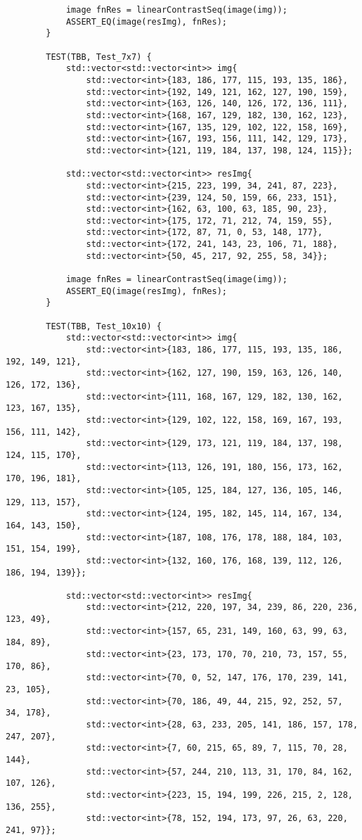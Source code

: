 \documentclass[14pt, russian]{extarticle}
\begin{document}
\begin{lstlisting}
			image fnRes = linearContrastSeq(image(img));
			ASSERT_EQ(image(resImg), fnRes);
		}
		
		TEST(TBB, Test_7x7) {
			std::vector<std::vector<int>> img{
				std::vector<int>{183, 186, 177, 115, 193, 135, 186},
				std::vector<int>{192, 149, 121, 162, 127, 190, 159},
				std::vector<int>{163, 126, 140, 126, 172, 136, 111},
				std::vector<int>{168, 167, 129, 182, 130, 162, 123},
				std::vector<int>{167, 135, 129, 102, 122, 158, 169},
				std::vector<int>{167, 193, 156, 111, 142, 129, 173},
				std::vector<int>{121, 119, 184, 137, 198, 124, 115}};
			
			std::vector<std::vector<int>> resImg{
				std::vector<int>{215, 223, 199, 34, 241, 87, 223},
				std::vector<int>{239, 124, 50, 159, 66, 233, 151},
				std::vector<int>{162, 63, 100, 63, 185, 90, 23},
				std::vector<int>{175, 172, 71, 212, 74, 159, 55},
				std::vector<int>{172, 87, 71, 0, 53, 148, 177},
				std::vector<int>{172, 241, 143, 23, 106, 71, 188},
				std::vector<int>{50, 45, 217, 92, 255, 58, 34}};
			
			image fnRes = linearContrastSeq(image(img));
			ASSERT_EQ(image(resImg), fnRes);
		}
		
		TEST(TBB, Test_10x10) {
			std::vector<std::vector<int>> img{
				std::vector<int>{183, 186, 177, 115, 193, 135, 186, 192, 149, 121},
				std::vector<int>{162, 127, 190, 159, 163, 126, 140, 126, 172, 136},
				std::vector<int>{111, 168, 167, 129, 182, 130, 162, 123, 167, 135},
				std::vector<int>{129, 102, 122, 158, 169, 167, 193, 156, 111, 142},
				std::vector<int>{129, 173, 121, 119, 184, 137, 198, 124, 115, 170},
				std::vector<int>{113, 126, 191, 180, 156, 173, 162, 170, 196, 181},
				std::vector<int>{105, 125, 184, 127, 136, 105, 146, 129, 113, 157},
				std::vector<int>{124, 195, 182, 145, 114, 167, 134, 164, 143, 150},
				std::vector<int>{187, 108, 176, 178, 188, 184, 103, 151, 154, 199},
				std::vector<int>{132, 160, 176, 168, 139, 112, 126, 186, 194, 139}};
			
			std::vector<std::vector<int>> resImg{
				std::vector<int>{212, 220, 197, 34, 239, 86, 220, 236, 123, 49},
				std::vector<int>{157, 65, 231, 149, 160, 63, 99, 63, 184, 89},
				std::vector<int>{23, 173, 170, 70, 210, 73, 157, 55, 170, 86},
				std::vector<int>{70, 0, 52, 147, 176, 170, 239, 141, 23, 105},
				std::vector<int>{70, 186, 49, 44, 215, 92, 252, 57, 34, 178},
				std::vector<int>{28, 63, 233, 205, 141, 186, 157, 178, 247, 207},
				std::vector<int>{7, 60, 215, 65, 89, 7, 115, 70, 28, 144},
				std::vector<int>{57, 244, 210, 113, 31, 170, 84, 162, 107, 126},
				std::vector<int>{223, 15, 194, 199, 226, 215, 2, 128, 136, 255},
				std::vector<int>{78, 152, 194, 173, 97, 26, 63, 220, 241, 97}};
			

\end{lstlisting}
\end{document}
